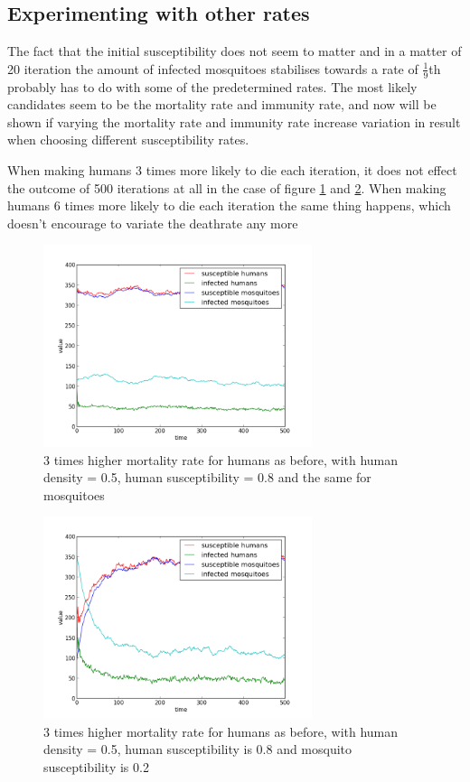 \documentclass[a4paper]{report}
\begin{document}
\FloatBarrier
\subsection{Experimenting with other rates}
The fact that the initial susceptibility does not seem to matter and in a matter
of 20 iteration the amount of infected mosquitoes stabilises towards a rate of
$\frac{1}{9}$th probably has to do with some of the predetermined rates. The most likely
candidates seem to be the mortality rate and immunity rate, and now will be shown if
varying the mortality rate and immunity rate increase variation in result when
choosing different susceptibility rates.

When making humans 3 times more likely to die each iteration, it does not effect
the outcome of 500 iterations at all in the case of figure
\ref{fig:death_rate} and \ref{fig:death_rate2}.
When making humans 6 times more likely to die each iteration
the same thing
happens, which doesn't encourage to variate the deathrate any more

\begin{figure}[htbp]
    \centering
    \includegraphics[width=0.7\textwidth]{05_08_05_08_higher_deathrate.png}
    \caption{3 times higher mortality rate for humans as before, with human density =
        0.5, human susceptibility = 0.8 and the same for mosquitoes
    }
    \label{fig:death_rate}
\end{figure}

\begin{figure}[htbp]
    \centering
    \includegraphics[width=0.7\textwidth]{05_08_05_02_higher_deathrate.png}
    \caption{3 times higher mortality rate for humans as before, with human density =
        0.5, human susceptibility is 0.8 and mosquito susceptibility is 0.2
    }
    \label{fig:death_rate2}
\end{figure}
\end{document}
